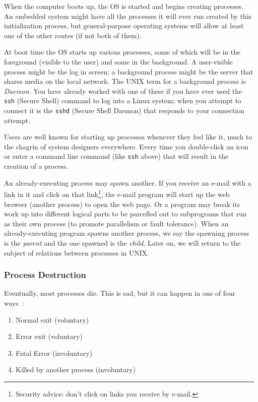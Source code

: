 When the computer boots up, the OS is started and begins creating processes. An embedded system might have all the processes it will ever run created by this initialization process, but general-purpose operating systems will allow at least one of the other routes (if not both of them).

At boot time the OS starts up various processes, some of which will be in the foreground (visible to the user) and some in the background. A user-visible process might be the log in screen; a background process might be the server that shares media on the local network. The UNIX term for a background process is \textit{Daemon}. You have already worked with one of these if you have ever used the \texttt{ssh} (Secure Shell) command to log into a Linux system; when you attempt to connect it is the \texttt{sshd} (Secure Shell Daemon) that responds to your connection attempt.

Users are well known for starting up processes whenever they feel like it, much to the chagrin of system designers everywhere. Every time you double-click an icon or enter a command line command (like \texttt{ssh} above) that will result in the creation of a process.

An already-executing process may spawn another. If you receive an e-mail with a link in it and click on that link\footnote{Security advice: don't click on links you receive by e-mail.}, the e-mail program will start up the web browser (another process) to open the web page. Or a program may break its work up into different logical parts to be parcelled out to subprograms that run as their own process (to promote parallelism or fault tolerance). When an already-executing program spawns another process, we say the spawning process is the \textit{parent} and the one spawned is the \textit{child}. Later on, we will return to the subject of relations between processes in UNIX.

\subsubsection*{Process Destruction}

Eventually, most processes die. This is sad, but it can happen in one of four ways~\cite{mos}:
\begin{enumerate}
	\item Normal exit (voluntary)
	\item Error exit (voluntary)
	\item Fatal Error (involuntary)
	\item Killed by another process (involuntary)
\end{enumerate}


